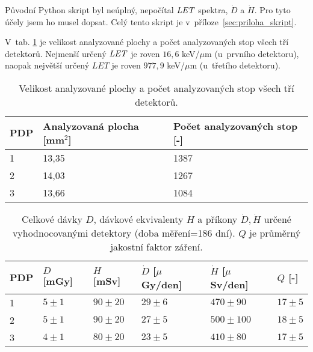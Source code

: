 
Původní Python skript byl neúplný, nepočítal $\mathit{LET}$ spektra, $\dot{D}$ a $\dot{H}$. Pro tyto účely jsem ho musel dopsat. Celý tento skript je v~příloze~\ref{sec:priloha_skript}. 
 
V~tab. \ref{tab:praktickaCast_analyzovanaPlocha} je velikost analyzované plochy a počet analyzovaných stop všech tří detektorů. Nejmenší určený $\mathit{LET}$ je roven $16,6$ keV/$\mu$m (u~prvního detektoru), naopak největší určený $LET$ je roven $977,9$ keV/$\mu$m (u~třetího detektoru). 
\begin{table}[H]
  \centering
  \caption{Velikost analyzované plochy a počet analyzovaných stop všech tří detektorů.}
  \label{tab:praktickaCast_analyzovanaPlocha}
  \begin{tabular}{lll}
	\toprule
	PDP&Analyzovaná plocha [mm$^2$]& Počet analyzovaných stop [-]\\
	\midrule
	1&13,35&1387\\
	2&14,03&1267\\
	3&13,66&1084\\
	\bottomrule
  \end{tabular}
\end{table}
\begin{table}[h]
  \centering
  \caption{Celkové dávky $D$, dávkové ekvivalenty $H$ a příkony $\dot{D},\dot{H}$ určené vyhodnocovanými detektory (doba měření=186 dní). $Q$ je průměrný jakostní faktor záření.}
  \label{tab:praktickaCast_davkyVysledky}
  \begin{tabular}{llllll}
	\toprule
	PDP&$D$ [mGy]&$H$ [mSv]&$\dot{D}$ [$\mu$Gy/den]&$\dot{H}$ [$\mu$Sv/den]& $Q$ [-]\\
	\midrule
	1&$5\pm1$&$90\pm20$&$29\pm6$&$470\pm90$&$17\pm5$\\
	2&$5\pm1$&$90\pm20$&$27\pm5$&$500\pm100$&$18\pm5$\\
	3&$4\pm1$&$80\pm20$&$23\pm5$&$410\pm80$&$17\pm5$\\
	\bottomrule
  \end{tabular}
\end{table}


